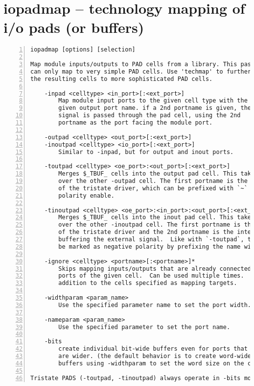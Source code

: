 \section{iopadmap -- technology mapping of i/o pads (or buffers)}
\label{cmd:iopadmap}
\begin{lstlisting}[numbers=left,frame=single]
    iopadmap [options] [selection]

Map module inputs/outputs to PAD cells from a library. This pass
can only map to very simple PAD cells. Use 'techmap' to further map
the resulting cells to more sophisticated PAD cells.

    -inpad <celltype> <in_port>[:<ext_port>]
        Map module input ports to the given cell type with the
        given output port name. if a 2nd portname is given, the
        signal is passed through the pad cell, using the 2nd
        portname as the port facing the module port.

    -outpad <celltype> <out_port>[:<ext_port>]
    -inoutpad <celltype> <io_port>[:<ext_port>]
        Similar to -inpad, but for output and inout ports.

    -toutpad <celltype> <oe_port>:<out_port>[:<ext_port>]
        Merges $_TBUF_ cells into the output pad cell. This takes precedence
        over the other -outpad cell. The first portname is the enable input
        of the tristate driver, which can be prefixed with `~` for negative
        polarity enable.

    -tinoutpad <celltype> <oe_port>:<in_port>:<out_port>[:<ext_port>]
        Merges $_TBUF_ cells into the inout pad cell. This takes precedence
        over the other -inoutpad cell. The first portname is the enable input
        of the tristate driver and the 2nd portname is the internal output
        buffering the external signal.  Like with `-toutpad`, the enable can
        be marked as negative polarity by prefixing the name with `~`.

    -ignore <celltype> <portname>[:<portname>]*
        Skips mapping inputs/outputs that are already connected to given
        ports of the given cell.  Can be used multiple times.  This is in
        addition to the cells specified as mapping targets.

    -widthparam <param_name>
        Use the specified parameter name to set the port width.

    -nameparam <param_name>
        Use the specified parameter to set the port name.

    -bits
        create individual bit-wide buffers even for ports that
        are wider. (the default behavior is to create word-wide
        buffers using -widthparam to set the word size on the cell.)

Tristate PADS (-toutpad, -tinoutpad) always operate in -bits mode.
\end{lstlisting}

